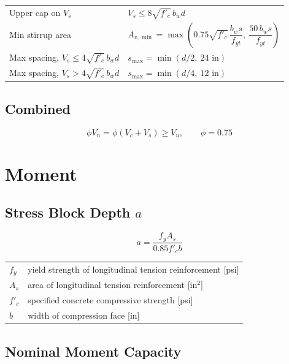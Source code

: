 \documentclass[10pt]{article}
\begin{document}

{\ttfamily\footnotesize
\begin{tabular}{@{}p{2.3in}p{4.0in}@{}}
Upper cap on $V_s$ & $V_s \leq 8\sqrt{f'_c}\, b_w d$ \\
Min stirrup area & $A_{v,\min} = \max\!\left(0.75\sqrt{f'_c}\,\dfrac{b_w s}{f_{yt}},\ \dfrac{50\, b_w s}{f_{yt}}\right)$ \\
Max spacing, $V_s \leq 4\sqrt{f'_c}\,b_w d$ & $s_{\max} = \min(d/2,\ 24\text{ in})$ \\
Max spacing, $V_s > 4\sqrt{f'_c}\,b_w d$ & $s_{\max} = \min(d/4,\ 12\text{ in})$ \\
\end{tabular}
}

\subsection{Combined}

\begin{equation}
\phi V_n = \phi (V_c + V_s) \geq V_u, \qquad \phi = 0.75
\end{equation}

\section{Moment}

\subsection{Stress Block Depth $a$}

\begin{equation}
a = \frac{f_y A_s}{0.85 f'_c b}
\end{equation}

{\ttfamily\footnotesize
\begin{tabular}{@{}ll@{}}
$f_y$ & yield strength of longitudinal tension reinforcement [psi] \\
$A_s$ & area of longitudinal tension reinforcement [in$^2$] \\
$f'_c$ & specified concrete compressive strength [psi] \\
$b$ & width of compression face [in] \\
\end{tabular}
}

\subsection{Nominal Moment Capacity}
\end{document}
